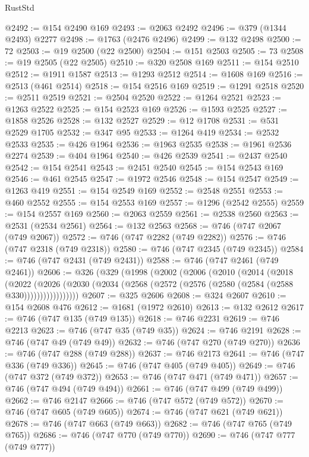 \begin{lexlean}{RustStd}
\begin{coremodule}
@2492 := @154 @2490 @169
@2493 := @2063 @2492
@2496 := @379 (@1344 @2493) @2277
@2498 := @1763 (@2476 @2496)
@2499 := @132 @2498
@2500 := 72
@2503 := @19 @2500 (@22 @2500)
@2504 := @151 @2503
@2505 := 73
@2508 := @19 @2505 (@22 @2505)
@2510 := @320 @2508 @169
@2511 := @154 @2510
@2512 := @1911 @1587
@2513 := @1293 @2512
@2514 := @1608 @169
@2516 := @2513 (@461 @2514)
@2518 := @154 @2516 @169
@2519 := @1291 @2518
@2520 := @2511 @2519
@2521 := @2504 @2520
@2522 := @1264 @2521
@2523 := @1263 @2522
@2525 := @154 @2523 @169
@2526 := @1593 @2525
@2527 := @1858 @2526
@2528 := @132 @2527
@2529 := @12 @1708
@2531 := @531 @2529 @1705
@2532 := @347 @95
@2533 := @1264 @419
@2534 := @2532 @2533
@2535 := @426 @1964
@2536 := @1963 @2535
@2538 := @1961 @2536 @2274
@2539 := @404 @1964
@2540 := @426 @2539
@2541 := @2437 @2540
@2542 := @154 @2541
@2543 := @2451 @2540
@2545 := @154 @2543 @169
@2546 := @461 @2545
@2547 := @1972 @2546
@2548 := @154 @2547
@2549 := @1263 @419
@2551 := @154 @2549 @169
@2552 := @2548 @2551
@2553 := @460 @2552
@2555 := @154 @2553 @169
@2557 := @1296 (@2542 @2555)
@2559 := @154 @2557 @169
@2560 := @2063 @2559
@2561 := @2538 @2560
@2563 := @2531 (@2534 @2561)
@2564 := @132 @2563
@2568 := @746 (@747 @2067 (@749 @2067))
@2572 := @746 (@747 @2282 (@749 @2282))
@2576 := @746 (@747 @2318 (@749 @2318))
@2580 := @746 (@747 @2345 (@749 @2345))
@2584 := @746 (@747 @2431 (@749 @2431))
@2588 := @746 (@747 @2461 (@749 @2461))
@2606 := @326
    (@329
      (@1998
        (@2002
          (@2006
            (@2010
              (@2014
                (@2018
                  (@2022
                    (@2026
                      (@2030 (@2034 (@2568 (@2572 (@2576 (@2580 (@2584 (@2588 @330)))))))))))))))))
@2607 := @325 @2606
@2608 := @324 @2607
@2610 := @154 @2608 @476
@2612 := @1681 (@1972 @2610)
@2613 := @132 @2612
@2617 := @746 (@747 @135 (@749 @135))
@2618 := @746 @2231
@2619 := @746 @2213
@2623 := @746 (@747 @35 (@749 @35))
@2624 := @746 @2191
@2628 := @746 (@747 @49 (@749 @49))
@2632 := @746 (@747 @270 (@749 @270))
@2636 := @746 (@747 @288 (@749 @288))
@2637 := @746 @2173
@2641 := @746 (@747 @336 (@749 @336))
@2645 := @746 (@747 @405 (@749 @405))
@2649 := @746 (@747 @372 (@749 @372))
@2653 := @746 (@747 @471 (@749 @471))
@2657 := @746 (@747 @494 (@749 @494))
@2661 := @746 (@747 @499 (@749 @499))
@2662 := @746 @2147
@2666 := @746 (@747 @572 (@749 @572))
@2670 := @746 (@747 @605 (@749 @605))
@2674 := @746 (@747 @621 (@749 @621))
@2678 := @746 (@747 @663 (@749 @663))
@2682 := @746 (@747 @765 (@749 @765))
@2686 := @746 (@747 @770 (@749 @770))
@2690 := @746 (@747 @777 (@749 @777))

\end{coremodule}
\end{lexlean}
